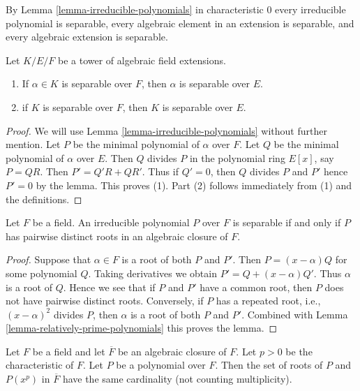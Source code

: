 \noindent
By Lemma \ref{lemma-irreducible-polynomials} in characteristic $0$ every
irreducible polynomial is separable, every algebraic element in an extension
is separable, and every algebraic extension is separable.

\begin{lemma}
\label{lemma-separable-goes-up}
Let $K/E/F$ be a tower of algebraic field extensions.
\begin{enumerate}
\item If $\alpha \in K$ is separable over $F$, then $\alpha$ is separable
over $E$.
\item if $K$ is separable over $F$, then $K$ is separable over $E$.
\end{enumerate}
\end{lemma}

\begin{proof}
We will use Lemma \ref{lemma-irreducible-polynomials} without further mention.
Let $P$ be the minimal polynomial of $\alpha$ over $F$.
Let $Q$ be the minimal polynomial of $\alpha$ over $E$.
Then $Q$ divides $P$ in the polynomial ring $E[x]$, say $P = QR$.
Then $P' = Q'R + QR'$. Thus if $Q' = 0$, then $Q$ divides $P$ and $P'$
hence $P' = 0$ by the lemma. This proves (1). Part (2)
follows immediately from (1) and the definitions.
\end{proof}

\begin{lemma}
\label{lemma-recognize-separable}
Let $F$ be a field. An irreducible polynomial $P$ over $F$
is separable if and only if $P$ has pairwise distinct roots in an
algebraic closure of $F$.
\end{lemma}

\begin{proof}
Suppose that $\alpha \in F$ is a root of both $P$ and $P'$.
Then $P = (x - \alpha)Q$ for some polynomial $Q$. Taking derivatives
we obtain $P' = Q + (x - \alpha)Q'$. Thus $\alpha$ is a root of $Q$.
Hence we see that if $P$ and $P'$ have a common root, then $P$
does not have pairwise distinct roots. Conversely, if $P$ has
a repeated root, i.e., $(x - \alpha)^2$ divides $P$, then $\alpha$
is a root of both $P$ and $P'$. Combined with
Lemma \ref{lemma-relatively-prime-polynomials} this proves the lemma.
\end{proof}

\begin{lemma}
\label{lemma-nr-roots-unchanged}
Let $F$ be a field and let $\overline{F}$ be an algebraic closure of $F$.
Let $p > 0$ be the characteristic of $F$. Let $P$ be a polynomial
over $F$. Then the set of roots of $P$ and $P(x^p)$ in $\overline{F}$
have the same cardinality (not counting multiplicity).
\end{lemma}

